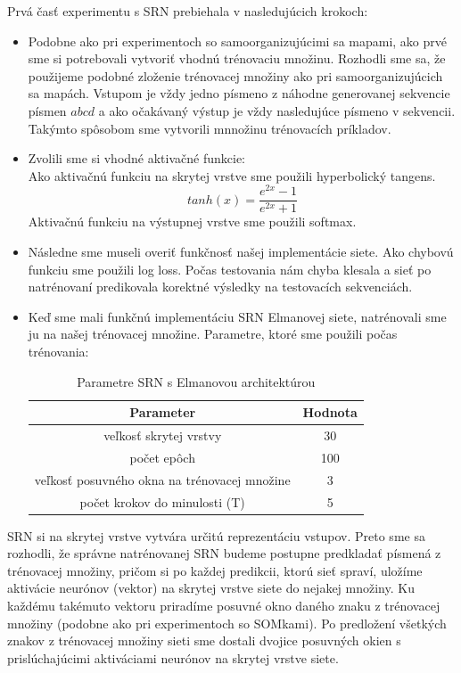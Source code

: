 Prvá časť experimentu s SRN prebiehala v nasledujúcich krokoch:
\begin{itemize}
    \item Podobne ako pri experimentoch so samoorganizujúcimi sa mapami, ako prvé sme si potrebovali vytvoriť vhodnú trénovaciu množinu.
     Rozhodli sme sa, že použijeme podobné zloženie trénovacej množiny ako pri samoorganizujúcich sa mapách.
     Vstupom je vždy jedno písmeno z náhodne generovanej sekvencie písmen $abcd$ a ako očakávaný výstup je vždy nasledujúce písmeno v sekvencii.
     Takýmto spôsobom sme vytvorili mnnožinu trénovacích príkladov.
     \item Zvolili sme si vhodné aktivačné funkcie:  \\
     Ako aktivačnú funkciu na skrytej vrstve sme použili hyperbolický tangens.
     \begin{equation}
         tanh(x) = \frac{e^{2x} - 1}{e^{2x} + 1}
     \end{equation}
     Aktivačnú funkciu na výstupnej vrstve sme použili softmax. 
     \item Následne sme museli overiť funkčnosť našej implementácie siete. Ako chybovú funkciu sme použili log loss.
    Počas testovania nám chyba klesala a sieť po natrénovaní predikovala korektné výsledky na testovacích sekvenciách.
     \item Keď sme mali funkčnú implementáciu SRN Elmanovej siete, natrénovali sme ju na našej trénovacej množine.
     Parametre, ktoré sme použili počas trénovania: \\
    \begin{table}[h!]
        \centering
        \begin{tabular}{|c|c|} 
        \hline
        Parameter & Hodnota \\ 
        \hline
        veľkosť skrytej vrstvy & 30  \\
        \hline
        počet epôch & 100  \\
        \hline
        veľkosť posuvného okna na trénovacej množine & 3  \\
        \hline
        počet krokov do minulosti (T) & 5 \\
        \hline
        \end{tabular}
        \caption{Parametre SRN s Elmanovou architektúrou}
        \label{table:1}
    \end{table}
\end{itemize}

SRN si na skrytej vrstve vytvára určitú reprezentáciu vstupov. Preto sme sa rozhodli, že 
správne natrénovanej SRN budeme postupne predkladať písmená z trénovacej množiny, pričom si po každej predikcii, ktorú sieť spraví,
 uložíme aktivácie neurónov (vektor) na skrytej vrstve siete do nejakej množiny. 
Ku každému takémuto vektoru priradíme posuvné okno daného znaku z trénovacej množiny (podobne ako pri experimentoch so SOMkami). 
Po predložení všetkých znakov z trénovacej množiny sieti sme dostali dvojice posuvných okien s prislúchajúcimi aktiváciami neurónov
na skrytej vrstve siete. \\

